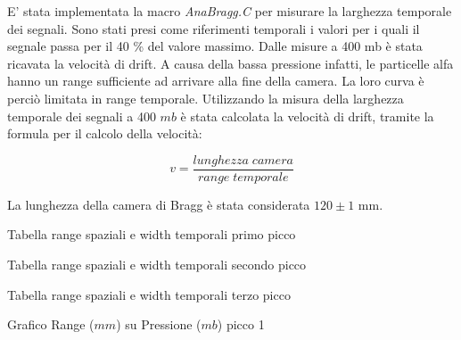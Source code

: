 E' stata implementata la macro \textit{AnaBragg.C} per misurare la larghezza temporale dei segnali. Sono stati presi come riferimenti temporali i valori per i quali il segnale
passa per il 40 \% del valore massimo. 
Dalle misure a 400 mb è stata ricavata la velocità di drift. A causa della bassa pressione infatti, le particelle alfa hanno un range sufficiente ad arrivare alla fine della camera. La loro curva è perciò limitata in range temporale. 
Utilizzando la misura della larghezza temporale dei segnali a 400 $mb$ è stata calcolata la velocità di drift, 
tramite la formula per il calcolo della velocità:

$$ v=\frac{lunghezza\;camera}{range\; temporale} $$

La lunghezza della camera di Bragg è stata considerata $120 \pm 1$ mm.

\begin{tabella}
 \centering
  
 \caption{Tabella range spaziali e width temporali primo picco}
 \label{tab:range_picco1.tex}
\end{tabella}

\begin{tabella}
 \centering
  
 \caption{Tabella range spaziali e width temporali secondo picco}
 \label{tab:range_picco2.tex}
\end{tabella}

\begin{tabella}
 \centering
  
 \caption{Tabella range spaziali e width temporali terzo picco}
 \label{tab:range_picco3.tex}
\end{tabella}



\begin{grafico}
 \centering
 \caption{Grafico Range ($mm$) su Pressione ($mb$) picco 1} 
 \label{gr:rangepicco1.tex} 
\end{grafico}


